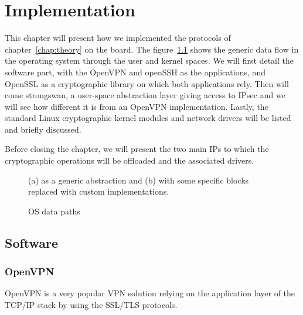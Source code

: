 \chapter{Implementation}
This chapter will present how we implemented the protocols of chapter~\ref{chap:theory} on the board.
The figure~\ref{fig:os-path-generic} shows the generic data flow in the operating system through the user and kernel spaces.
We will first detail the software part, with the OpenVPN and openSSH as the applications, and OpenSSL as a cryptographic library on which both applications rely.
Then will come strongswan, a user-space abstraction layer giving access to IPsec and we will see how different it is from an OpenVPN implementation.
Lastly, the standard Linux cryptographic kernel modules and network drivers will be listed and briefly discussed.

Before closing the chapter, we will present the two main IPs to which the cryptographic operations will be offloaded and the associated drivers.


\begin{figure}[ht]
\center
{}
\caption{OS data paths}{(a) as a generic abstraction and (b) with some specific blocks replaced with custom implementations.}
\label{fig:os-path-generic}
\end{figure}

\section{Software}

\subsection{OpenVPN}
OpenVPN is a very popular VPN solution relying on the application layer of the TCP/IP stack by using the SSL/TLS protocols.

